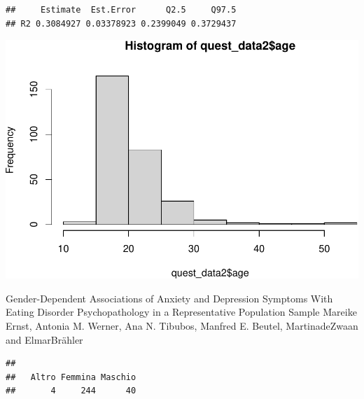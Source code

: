 \documentclass[
]{article}
\newenvironment{Shaded}{\begin{snugshade}}{\end{snugshade}}
\newcommand{\FunctionTok}[1]{\textcolor[rgb]{0.00,0.00,0.00}{#1}}
\newcommand{\NormalTok}[1]{#1}
\newcommand{\SpecialCharTok}[1]{\textcolor[rgb]{0.00,0.00,0.00}{#1}}
\begin{document}
\begin{verbatim}
##     Estimate  Est.Error      Q2.5     Q97.5
## R2 0.3084927 0.03378923 0.2399049 0.3729437
\end{verbatim}

\begin{Shaded}
\end{Shaded}

\includegraphics{050_quest_groups_files/figure-latex/unnamed-chunk-1-8.pdf}

Gender-Dependent Associations of Anxiety and Depression Symptoms With
Eating Disorder Psychopathology in a Representative Population Sample
Mareike Ernst, Antonia M. Werner, Ana N. Tibubos, Manfred E. Beutel,
MartinadeZwaan and ElmarBrähler

\begin{Shaded}
\end{Shaded}

\begin{verbatim}
## 
##   Altro Femmina Maschio 
##       4     244      40
\end{verbatim}

\begin{Shaded}
\end{Shaded}
\end{document}

